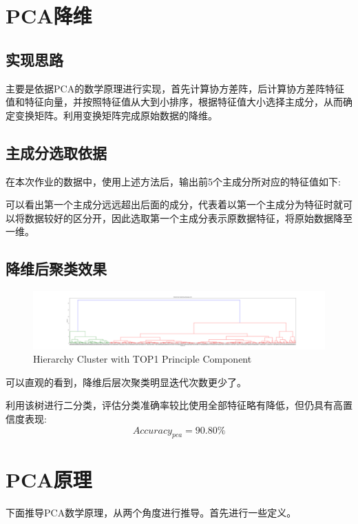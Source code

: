 \documentclass[UTF8]{ctexart}
\begin{document}
\section{PCA降维}
\subsection{实现思路}
主要是依据PCA的数学原理进行实现，首先计算协方差阵，后计算协方差阵特征值和特征向量，并按照特征值从大到小排序，根据特征值大小选择主成分，从而确定变换矩阵。利用变换矩阵完成原始数据的降维。
\subsection{主成分选取依据}
在本次作业的数据中，使用上述方法后，输出前5个主成分所对应的特征值如下:
\begin{equation}
    [190.72474391,11.58899724,8.35373783,6.27501677,   5.33837007]
\end{equation}

可以看出第一个主成分远远超出后面的成分，代表着以第一个主成分为特征时就可以将数据较好的区分开，因此选取第一个主成分表示原数据特征，将原始数据降至一维。

\subsection{降维后聚类效果}
\begin{figure}[H]
    \centering
    \includegraphics[scale=0.1]{../HClust-t1.png}
    \caption{Hierarchy Cluster with TOP1 Principle Component}
\end{figure}

可以直观的看到，降维后层次聚类明显迭代次数更少了。

利用该树进行二分类，评估分类准确率较比使用全部特征略有降低，但仍具有高置信度表现:
\begin{equation}
    Accuracy_{pca} = 90.80\%
\end{equation}

\section{PCA原理}

下面推导PCA数学原理，从两个角度进行推导。首先进行一些定义。
\end{document}
